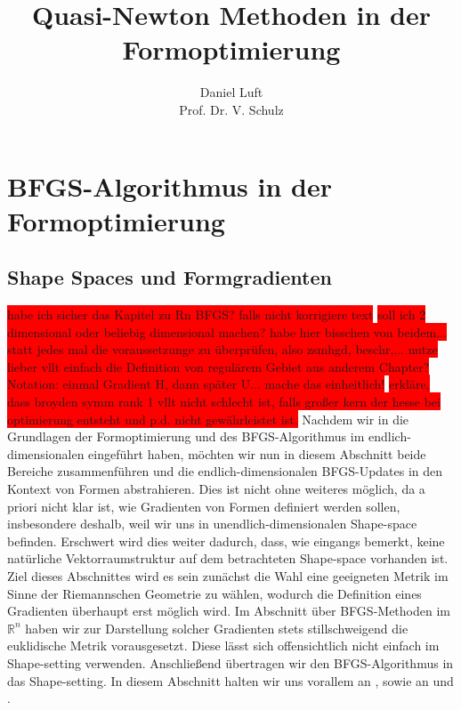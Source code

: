 \documentclass[bibliography=totoc,12pt,a4paper]{scrartcl}
\theoremstyle{exampstyle}
\numberwithin{equation}{section}
\begin{document}
\title{Quasi-Newton Methoden in der Formoptimierung}

\author{Daniel Luft \\ Prof. Dr. V. Schulz}

  \pagestyle{empty}

  \pagestyle{headings}
  

\section{BFGS-Algorithmus in der Formoptimierung}
\subsection{Shape Spaces und Formgradienten}
\colorbox{red}{habe ich sicher das Kapitel zu Rn BFGS? falls nicht korrigiere text}
\colorbox{red}{soll ich 2 dimensional oder beliebig dimensional machen? habe hier bisschen von beidem...}
\colorbox{red}{ statt jedes mal die voraussetzunge zu überprüfen, also zsmhgd, beschr,... nutze lieber vllt einfach die Definition von regulärem Gebiet aus anderem Chapter?}
\colorbox{red}{Notation: einmal Gradient H, dann später U... mache das einheitlich!}
\colorbox{red}{erkläre, dass broyden symm rank 1 vllt nicht schlecht ist, falls großer kern der hesse bei optimierung entsteht und p.d. nicht gewährleistet ist.}
Nachdem wir in die Grundlagen der Formoptimierung und des BFGS-Algorithmus im endlich-dimensionalen eingeführt haben, möchten wir nun in diesem Abschnitt beide Bereiche zusammenführen und die endlich-dimensionalen BFGS-Updates in den Kontext von Formen abstrahieren. Dies ist nicht ohne weiteres möglich, da a priori nicht klar ist, wie Gradienten von Formen definiert werden sollen, insbesondere deshalb, weil wir uns in unendlich-dimensionalen Shape-space befinden. Erschwert wird dies weiter dadurch, dass, wie eingangs bemerkt, keine natürliche Vektorraumstruktur auf dem betrachteten Shape-space vorhanden ist. Ziel dieses Abschnittes wird es sein zunächst die Wahl eine geeigneten Metrik im Sinne der Riemannschen Geometrie zu wählen, wodurch die Definition eines Gradienten überhaupt erst möglich wird. Im Abschnitt über BFGS-Methoden im $\mathbb{R}^n$ haben wir zur Darstellung solcher Gradienten stets stillschweigend die euklidische Metrik vorausgesetzt. Diese lässt sich offensichtlich nicht einfach im Shape-setting verwenden. Anschließend übertragen wir den BFGS-Algorithmus in das Shape-setting. In diesem Abschnitt halten wir uns vorallem an \cite{bfgs1}, sowie an \cite{shape_space} und \cite{bfgs2}.
\end{document}
